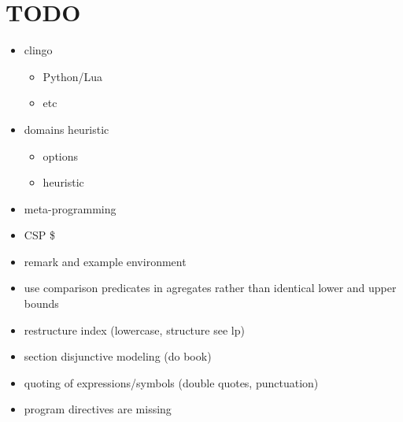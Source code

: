 \section{TODO}
\begin{itemize}
\item clingo
  \begin{itemize}
  \item Python/Lua
  \item etc
  \end{itemize}
\item domains heuristic
  \begin{itemize}
  \item options
  \item heuristic
  \end{itemize}
\item meta-programming
\item CSP \$
\item remark and example environment
\item use comparison predicates in agregates rather than identical lower and upper bounds
\item restructure index (lowercase, structure see lp)
\item section disjunctive modeling (do book)
\item quoting of expressions/symbols (double quotes, punctuation)
\item program directives are missing
\end{itemize}

